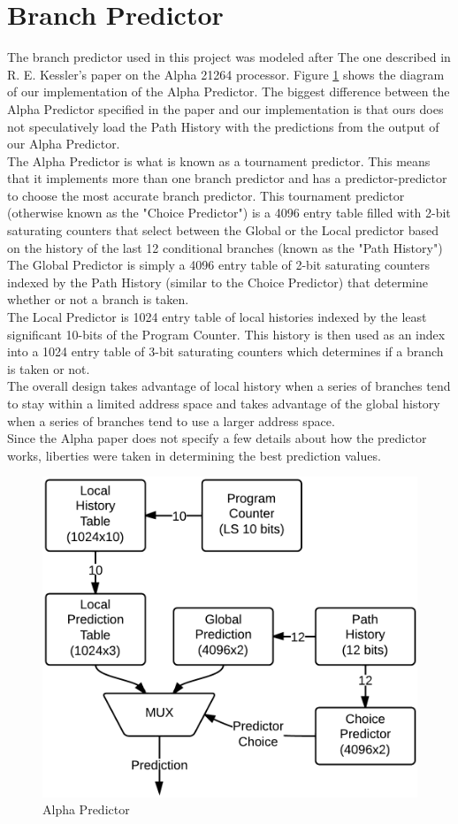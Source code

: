 \documentclass[twocolumn]{article}
\newcommand{\centerimage}[3]{
\begin{figure}[ht!]  
\begin{center} #1
\caption{#2}
\label{#3}
\end{center}
\end{figure}}
\begin{document}
\section{Branch Predictor}
The branch predictor used in this project was modeled after
The one described in R. E. Kessler's paper on the Alpha 
21264 processor. Figure \ref{Alpha} shows the diagram of
our implementation of the Alpha Predictor. The biggest
difference between the Alpha Predictor specified in the
paper and our implementation is that ours does not
speculatively load the Path History with the predictions
from the output of our Alpha Predictor. \\
The Alpha Predictor is what is known as a tournament predictor.
This means that it implements more than one branch predictor 
and has a predictor-predictor to choose the most accurate branch 
predictor. This tournament predictor (otherwise known as the 
"Choice Predictor") is a 4096 entry table filled with 2-bit 
saturating counters that select between the Global or the Local 
predictor based on the history of the last 12 conditional branches
(known as the "Path History") \\
The Global Predictor is simply a 4096 entry table of 2-bit saturating 
counters indexed by the Path History (similar to the Choice Predictor)
that determine whether or not a branch is taken. \\
The Local Predictor is 1024 entry table of local histories indexed
by the least significant 10-bits of the Program Counter. This history
is then used as an index into a 1024 entry table of 3-bit saturating
counters which determines if a branch is taken or not. \\
The overall design takes advantage of local history when a series of
branches tend to stay within a limited address space and takes advantage
of the global history when a series of branches tend to use a larger
address space. \\
Since the Alpha paper does not specify a few details about how the predictor
works, liberties were taken in determining the best prediction values. 

\centerimage{\includegraphics[width=\columnwidth]{AlphaPredictor.png}}{Alpha Predictor}{Alpha}
\end{document}
